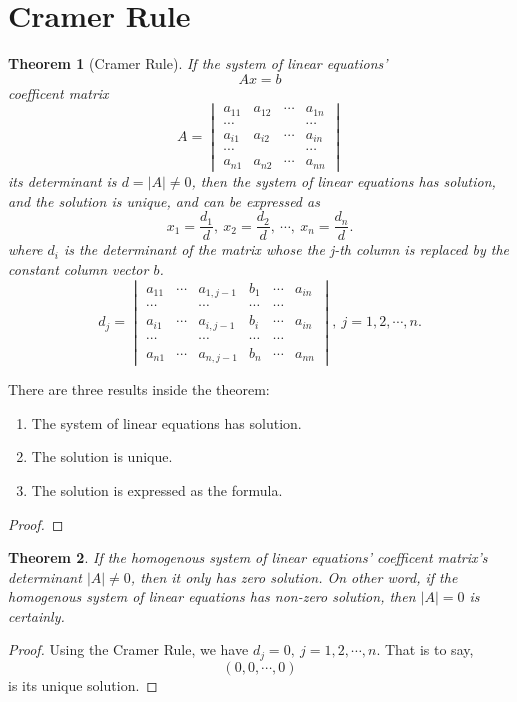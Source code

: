 \documentclass{article}
\newtheorem{theorem}{Theorem}[section]
\theoremstyle{definition}
\begin{document}
\section{Cramer Rule}
\begin{theorem}[Cramer Rule]

    If the system of linear equations' 
    $$Ax=b$$
    coefficent matrix 
    $$
    A=
    \begin{vmatrix}
        a_{11} & a_{12} & \cdots & a_{1n}\\
        \cdots &  &  & \cdots\\
        a_{i1} & a_{i2} & \cdots & a_{in}\\
        \cdots &  &  & \cdots\\
        a_{n1} & a_{n2} & \cdots & a_{nn}
    \end{vmatrix}
    $$
    its determinant is $d = |A| \neq 0$, then the system of 
    linear equations has solution, and the solution is unique, and can be expressed as 
    $$x_{1}=\frac{d_{1}}{d},\ x_{2}=\frac{d_{2}}{d},\ \cdots,\ x_{n}=\frac{d_{n}}{d}.$$
    where $d_{i}$ is the determinant of the matrix whose the j-th column is replaced by 
    the constant column vector $b$.
    $$d_{j}=
    \begin{vmatrix}
        a_{11} & \cdots & a_{1,j-1} & b_{1} &\cdots & a_{in}\\
        \cdots &  & \cdots & \cdots & \cdots\\
        a_{i1} & \cdots & a_{i,j-1} & b_{i} &\cdots & a_{in}\\
        \cdots &  & \cdots & \cdots & \cdots\\
        a_{n1} & \cdots & a_{n,j-1} & b_{n} &\cdots & a_{nn}
    \end{vmatrix}
    ,\ j=1,2,\cdots,n.$$
\end{theorem}
There are three results inside the theorem:
\begin{enumerate}
    \item The system of linear equations has solution.
    \item The solution is unique.
    \item The solution is expressed as the formula.
\end{enumerate}

\begin{proof}
\end{proof}

\begin{theorem}
    If the homogenous system of linear equations' coefficent matrix's 
    determinant $|A|\neq 0$, then it only has zero solution. On other word, if 
    the homogenous system of linear equations has non-zero solution, then $|A|=0$ is certainly.
\end{theorem}
\begin{proof}
    Using the Cramer Rule, we have $d_{j}=0,\ j=1,2,\cdots,n$. That is to say,
    $$(0,0,\cdots,0)$$ is its unique solution.
\end{proof}
\end{document}
